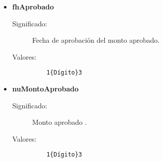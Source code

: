 \begin{itemize}
    \item \textbf{fhAprobado}
      \begin{description}
        \item [Significado:] Fecha de aprobación del monto aprobado.
        \item [Valores:]{\begin{lstlisting}
	1{Dígito}3\end{lstlisting}}\end{description}
    
    \item \textbf{nuMontoAprobado}
      \begin{description}
        \item [Significado:] Monto aprobado .
        \item [Valores:]{\begin{lstlisting}
	1{Dígito}3\end{lstlisting}}\end{description}

\end{itemize}

